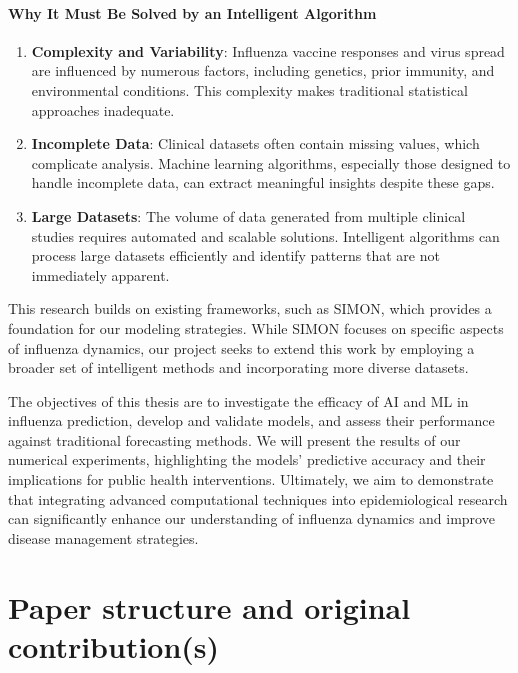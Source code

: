 \documentclass[runningheads,a4paper,11pt]{report}
\begin{document}
\paragraph{Why It Must Be Solved by an Intelligent Algorithm}

\begin{enumerate}
    \item \textbf{Complexity and Variability}: Influenza vaccine responses and virus spread are influenced by numerous factors, including genetics, prior immunity, and environmental conditions. This complexity makes traditional statistical approaches inadequate.
    \item \textbf{Incomplete Data}: Clinical datasets often contain missing values, which complicate analysis. Machine learning algorithms, especially those designed to handle incomplete data, can extract meaningful insights despite these gaps.
    \item \textbf{Large Datasets}: The volume of data generated from multiple clinical studies requires automated and scalable solutions. Intelligent algorithms can process large datasets efficiently and identify patterns that are not immediately apparent.
\end{enumerate}
 

This research builds on existing frameworks, such as SIMON, which provides a foundation for our modeling strategies. While SIMON focuses on specific aspects of influenza dynamics, our project seeks to extend this work by employing a broader set of intelligent methods and incorporating more diverse datasets.

The objectives of this thesis are to investigate the efficacy of AI and ML in influenza prediction, develop and validate models, and assess their performance against traditional forecasting methods. We will present the results of our numerical experiments, highlighting the models' predictive accuracy and their implications for public health interventions. Ultimately, we aim to demonstrate that integrating advanced computational techniques into epidemiological research can significantly enhance our understanding of influenza dynamics and improve disease management strategies.

 


\section{Paper structure and original contribution(s)}
\label{section:structure}
\end{document}
